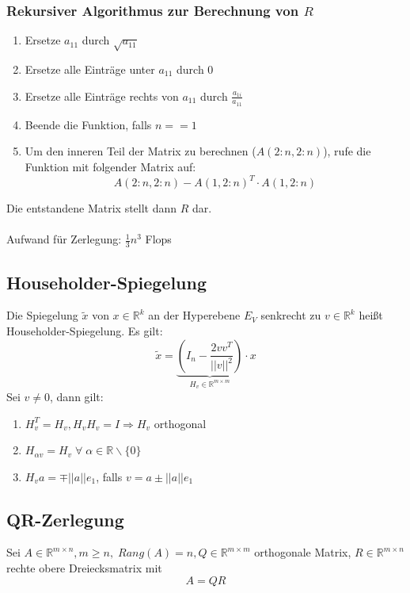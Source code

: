 \documentclass[a4paper,twocolumn,10pt]{article}
\begin{document}
\subsubsection{Rekursiver Algorithmus zur Berechnung von $R$}
\begin{enumerate}
\item Ersetze $a_{11}$ durch $\sqrt{a_{11}}$
\item Ersetze alle Einträge unter $a_{11}$ durch $0$
\item Ersetze alle Einträge rechts von $a_{11}$ durch $\frac{a_{1i}}{a_{11}}$
\item Beende die Funktion, falls $n==1$
\item Um den inneren Teil der Matrix zu berechnen ($A(2:n,2:n)$), rufe die Funktion mit folgender Matrix auf:
\begin{equation*}
A(2:n,2:n)-A(1,2:n)^T\cdot A(1,2:n)
\end{equation*}
\end{enumerate}
Die entstandene Matrix stellt dann $R$ dar.\\\\
Aufwand für Zerlegung: $\frac{1}{3}n^3$ Flops

\subsection{Householder-Spiegelung}
Die Spiegelung $\tilde{x}$ von $x\in\mathbb{R}^k$ an der Hyperebene $E_V$ senkrecht zu $v\in\mathbb{R}^k$ heißt Householder-Spiegelung. Es gilt:
\begin{equation*}
\tilde{x}=\underbrace{\left(I_n-\frac{2vv^T}{||v||^2}\right)}_{H_v\in\mathbb{R}^{m\times m}}\cdot x
\end{equation*}
Sei $v\neq 0$, dann gilt:
\begin{enumerate}[label=$\bullet$]
\item $H_v^T=H_v,H_vH_v=I\Rightarrow H_v$ orthogonal
\item $H_{\alpha v}=H_v\;\forall\;\alpha\in\mathbb{R}\backslash\{0\}$
\item $H_va=\mp ||a||e_1$, falls $v=a\pm ||a||e_1$
\end{enumerate}

\subsection{QR-Zerlegung}
Sei $A\in\mathbb{R}^{m\times n},m\geq n,\;Rang(A)=n,Q\in\mathbb{R}^{m\times m}$ orthogonale Matrix, $R\in\mathbb{R}^{m\times n}$ rechte obere Dreiecksmatrix mit
\begin{equation*}
A=QR
\end{equation*}
\end{document}
